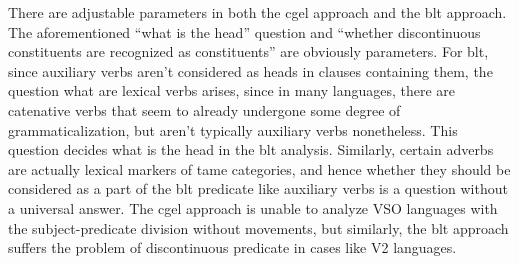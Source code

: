 \documentclass[UTF8, a4paper, oneside, scheme=plain]{ctexart}
\begin{document}
There are adjustable parameters in both the \ac{cgel} approach and the \ac{blt} approach.
The aforementioned ``what is the head'' question 
and ``whether discontinuous constituents are recognized as constituents''
are obviously parameters.
For \ac{blt}, since auxiliary verbs aren't considered as heads in clauses containing them,
the question what are lexical verbs arises,
since in many languages, 
there are catenative verbs that seem to already undergone some degree of grammaticalization,
but aren't typically auxiliary verbs nonetheless.
This question decides what is the head in the \ac{blt} analysis.
Similarly, certain adverbs are actually lexical markers of \ac{tame} categories,
and hence whether they should be considered as a part of the \ac{blt} predicate like auxiliary verbs
is a question without a universal answer.
The \ac{cgel} approach is unable to analyze VSO languages 
with the subject-predicate division without movements,
but similarly, the \ac{blt} approach suffers the problem of discontinuous predicate
in cases like V2 languages.
\end{document}
